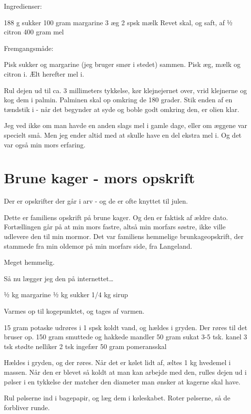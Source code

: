 \documentclass[
]{book}
\begin{document}
Ingredienser:

188 g sukker
100 gram margarine
3 æg
2 spsk mælk
Revet skal, og saft, af ½ citron
400 gram mel

Fremgangsmåde:

Pisk sukker og margarine (jeg bruger smør i stedet) sammen.
Pisk æg, mælk og citron i.
Ælt herefter mel i.

Rul dejen ud til ca. 3 millimeters tykkelse, kør klejnejernet over, vrid klejnerne og kog dem i palmin. Palminen skal op omkring de 180 grader. Stik enden af en tændstik i - når det begynder at syde og boble godt omkring den, er olien klar.

Jeg ved ikke om man havde en anden slags mel i gamle dage, eller om æggene var specielt små. Men jeg ender altid med at skulle have en del ekstra mel i. Og det var også min mors erfaring.

\section{Brune kager - mors opskrift}\label{brune-kager---mors-opskrift}

Der er opskrifter der går i arv - og de er ofte knyttet til julen.

Dette er familiens opskrift på brune kager. Og den er faktisk af ældre dato. Fortællingen går på at min mors fastre, altså min morfars søstre, ikke ville udlevere den til min mormor. Det var familiens hemmelige brunkageopskrift, der stammede fra min oldemor på min morfars side, fra Langeland.

Meget hemmelig.

Så nu lægger jeg den på internettet\ldots{}

½ kg margarine
½ kg sukker
1/4 kg sirup

Varmes op til kogepunktet, og tages af varmen.

15 gram potaske udrøres i 1 spsk koldt vand, og hældes i gryden. Der røres til det bruser op.
150 gram smuttede og hakkede mandler
50 gram sukat
3-5 tsk. kanel
3 tsk stødte nelliker
2 tsk ingefær
50 gram pomeransskal

Hældes i gryden, og der røres. Når det er kølet lidt af, æltes 1 kg hvedemel i massen. Når den er blevet så koldt at man kan arbejde med den, rulles dejen ud i pølser i en tykkelse der matcher den diameter man ønsker at kagerne skal have.

Rul pølserne ind i bagepapir, og læg dem i køleskabet. Roter pølserne, så de forbliver runde.
\end{document}
